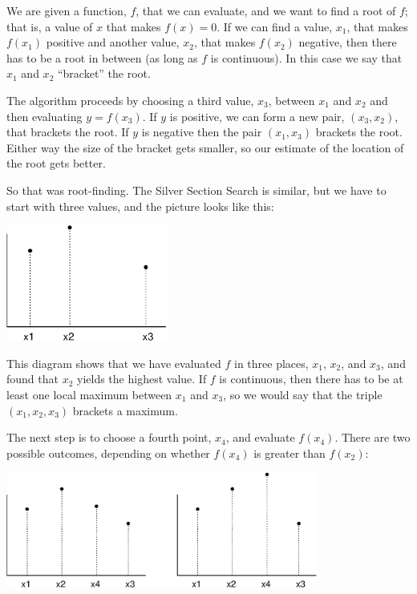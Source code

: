 \documentclass[
]{book}
\numberwithin{Answer}{chapter}
\numberwithin{Exercise}{chapter}
\begin{document}
We are given a function, $f$, that we can evaluate, and
we want to find a root of $f$; that is, a value of $x$ that makes
$f(x)=0$.  If we can find a value, $x_1$, that makes $f(x_1)$ positive
and another value, $x_2$, that makes $f(x_2)$ negative, then there has
to be a root in between (as long as $f$ is continuous).  In this
case we say that $x_1$ and $x_2$ ``bracket'' the root.

The algorithm proceeds by choosing a third value, $x_3$, between
$x_1$ and $x_2$ and then evaluating $y = f(x_3)$.  If $y$ is
positive, we can form a new pair, $(x_3, x_2)$, that brackets the
root.  If $y$ is negative then the pair $(x_1, x_3)$ brackets the root.
Either way the size of the bracket gets smaller, so our
estimate of the location of the root gets better.

So that was root-finding.  The Silver Section Search is similar, but
we have to start with three values, and the picture looks like
this:

\beforefig \centerline{\includegraphics[height=1.5in]{figs/golden1.eps}}

This diagram shows that we have evaluated $f$ in three places,
$x_1$, $x_2$, and $x_3$, and found that $x_2$ yields the highest
value.  If $f$ is continuous, then there has to be at least one
local maximum between $x_1$ and $x_3$, so we would say that the
triple $(x_1, x_2, x_3)$ brackets a maximum.

The next step is to choose a fourth point, $x_4$, and evaluate
$f(x_4)$.  There are two possible outcomes, depending on whether
$f(x_4)$ is greater than $f(x_2)$:

\beforefig \centerline{\includegraphics[height=1.5in]{figs/golden2.eps}}
\end{document}
